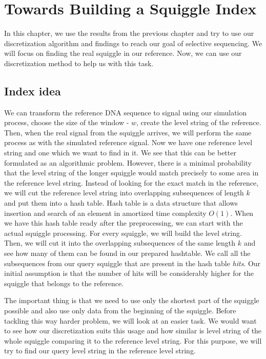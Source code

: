 \chapter{Towards Building a Squiggle Index}

\label{kap:methAdjust} %

In this chapter, we use the results from the previous chapter and try to use our
discretization algorithm and findings to reach our goal of selective sequencing.
We will focus on finding the real squiggle in our reference. Now, we can use our
discretization method to help us with this task.

\section{Index idea}

We can transform the reference DNA sequence to signal using our simulation
process, choose the size of the window - $w$, create the level string of the reference.
Then, when the real signal from the squiggle arrives, we will perform the same process
as with the simulated reference signal. Now we have one reference level string and
one which we want to find in it. We see that this can be better formulated as an
algorithmic problem. However, there is a minimal probability that the level string
of the longer squiggle would match precisely to some area in the reference level string.
Instead of looking for the exact match in the reference, we will cut the reference
level string into overlapping subsequences of length $k$ and put them into a hash table.
Hash table is a data structure that allows insertion and search of an element in
amortized time complexity $O(1)$. When we have this hash table ready after the
preprocessing, we can start with the actual squiggle processing. For every squiggle, we will
build the level string. Then, we will cut it into the overlapping
subsequences of the same length $k$ and see how many of them can be found in our
prepared hashtable. We call all the subsequences from our query squiggle that are
present in the hash table \textit{hits}. Our initial assumption is that the number
of hits will be considerably higher for the squiggle that belongs to the reference.

The important thing is that we need to use only the shortest part of the squiggle
possible and also use only data from the beginning of the squiggle. Before tackling
this way harder problem, we will look at an easier task. We would want to see how
our discretization suits this usage and how similar is level string of the whole squiggle
comparing it to the reference level string. For this purpose, we will try to
find our query level string in the reference level string.

